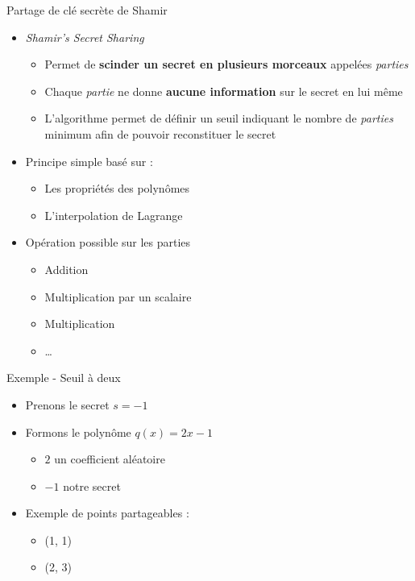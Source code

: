 \documentclass[9pt]{beamer}
\begin{document}
\begin{frame}{Partage de clé secrète de Shamir}
    \begin{itemize}[<+- | alert@+>]
        \item \textit{Shamir's Secret Sharing}
        \begin{itemize}
            \item Permet de \textbf{scinder un secret en plusieurs morceaux} appelées \textit{parties}
            \item Chaque \textit{partie} ne donne \textbf{aucune information} sur le secret en lui même
            \item L'algorithme permet de définir un seuil indiquant le nombre de \textit{parties} minimum afin de pouvoir reconstituer le secret 
        \end{itemize}
        \item Principe simple basé sur :
        \begin{itemize}
            \item Les propriétés des polynômes
            \item L'interpolation de Lagrange
        \end{itemize}
        \item Opération possible sur les parties
        \begin{itemize}
            \item Addition
            \item Multiplication par un scalaire
            \item Multiplication
            \item \ldots
        \end{itemize}
    \end{itemize}
\end{frame}

\begin{frame}{Exemple - Seuil à deux}
    \begin{itemize}
        \item Prenons le secret $s = -1$
        \item Formons le polynôme $q(x) = 2x - 1$
        \begin{itemize}
            \item $2$ un coefficient aléatoire
            \item $-1$ notre secret
        \end{itemize}
        \item Exemple de points partageables :
        \begin{itemize}
            \item (1, 1)
            \item (2, 3)
        \end{itemize}
    \end{itemize}
\end{frame}
\end{document}
